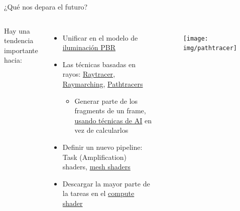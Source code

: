 \begin{frame}{¿Qué nos depara el futuro?}
\begin{columns}
    Hay una tendencia importante hacia:
    \begin{itemize}
        \item Unificar en el modelo de \href{https://en.wikipedia.org/wiki/Physically_based_rendering}{iluminación PBR}
        \item Las técnicas basadas en rayos: \href{https://en.wikipedia.org/wiki/Ray_tracing_(graphics)}{Raytracer}, \href{https://en.wikipedia.org/wiki/Ray_marching}{Raymarching}, \href{https://en.wikipedia.org/wiki/Path_tracing}{Pathtracers}
        \begin{itemize}
            \item Generar parte de los fragments de un frame, \href{https://www.youtube.com/watch?v=5PHBXY0FI5o&t=2s}{usando técnicas de AI} en vez de calcularlos
        \end{itemize}
        \item Definir un nuevo pipeline: Task (Amplification) shaders, \href{https://www.khronos.org/blog/mesh-shading-for-vulkan}{mesh shaders}
        \item Descargar la mayor parte de la tareas en el \href{https://en.wikipedia.org/wiki/Compute_kernel}{compute shader}
    \end{itemize}
\begin{figure}[htp]
  \centering
  \texttt{[image: img/pathtracer]}
\end{figure}
\end{columns}
\end{frame}

